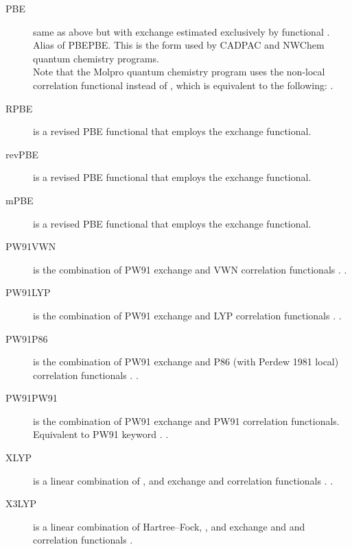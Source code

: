 \begin{description}
\item[PBE] same as above but with exchange estimated exclusively by
   functional \cite{dft:pbe}. Alias of PBEPBE. 
  This is the form used by CADPAC and NWChem quantum chemistry programs.
  \\
  Note that the Molpro quantum chemistry program uses the 
  non-local correlation functional instead of , which is 
  equivalent to the following:
  .

\item[RPBE] is a revised PBE functional that employs the 
   exchange functional.

\item[revPBE] is a revised PBE functional that employs the 
   exchange functional.

\item[mPBE] is a revised PBE functional that employs the 
   exchange functional.

\item[PW91VWN] is the combination of PW91 exchange and VWN correlation functionals 
   \cite{dft:pw91,dft:vwn}.
  .

\item[PW91LYP] is the combination of PW91 exchange and LYP correlation functionals 
   \cite{dft:pw91,dft:lyp1,dft:lyp2}.
  .

\item[PW91P86] is the combination of PW91 exchange and P86 (with Perdew 1981 local) 
  correlation functionals \cite{dft:pw91,dft:pw86,dft:pz81}.
  .

\item[PW91PW91] is the combination of PW91 exchange and PW91 correlation functionals. 
  Equivalent to PW91 keyword \cite{dft:pw91}.
  .

\item[XLYP] is a linear combination of ,  and 
  exchange and  correlation functionals \cite{dft:xlyp,dft:x3lyp}.
  .

\item[X3LYP] is a linear combination of Hartree--Fock, ,  
  and  exchange and  and  correlation functionals 
  \cite{dft:xlyp,dft:x3lyp}.

\end{description}


